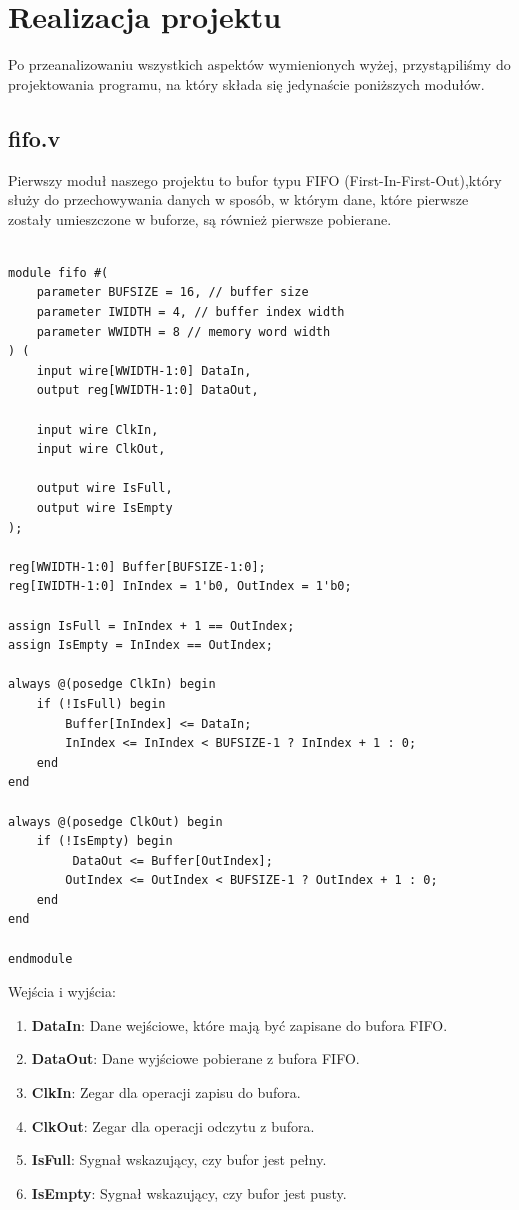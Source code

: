 \documentclass[12pt, a4paper]{article}
\begin{document}
\section{Realizacja projektu}
Po przeanalizowaniu wszystkich aspektów wymienionych wyżej, przystąpiliśmy do
projektowania programu, na który składa się jedynaście poniższych modułów.
\subsection{fifo.v}
Pierwszy moduł naszego projektu to bufor typu FIFO (First-In-First-Out),który służy do przechowywania danych w sposób, w którym dane, które pierwsze zostały umieszczone w buforze, są również pierwsze pobierane.
\begin{lstlisting}[style=prettyverilog,caption={Moduł fifo.v}]

module fifo #(
    parameter BUFSIZE = 16, // buffer size
    parameter IWIDTH = 4, // buffer index width
    parameter WWIDTH = 8 // memory word width
) (
    input wire[WWIDTH-1:0] DataIn,
    output reg[WWIDTH-1:0] DataOut,
    
    input wire ClkIn,
    input wire ClkOut,

    output wire IsFull,
    output wire IsEmpty
);

reg[WWIDTH-1:0] Buffer[BUFSIZE-1:0];
reg[IWIDTH-1:0] InIndex = 1'b0, OutIndex = 1'b0;

assign IsFull = InIndex + 1 == OutIndex;
assign IsEmpty = InIndex == OutIndex;

always @(posedge ClkIn) begin
    if (!IsFull) begin
        Buffer[InIndex] <= DataIn;
        InIndex <= InIndex < BUFSIZE-1 ? InIndex + 1 : 0;
    end
end

always @(posedge ClkOut) begin
    if (!IsEmpty) begin
	     DataOut <= Buffer[OutIndex];
        OutIndex <= OutIndex < BUFSIZE-1 ? OutIndex + 1 : 0;
    end
end

endmodule
\end{lstlisting}
Wejścia i wyjścia:
\begin{enumerate}
    \item \textbf{\fontsize{11}{10}\selectfont DataIn}: Dane wejściowe, które mają być zapisane do bufora FIFO.
    \item \textbf{\fontsize{11}{10}\selectfont DataOut}: Dane wyjściowe pobierane z bufora FIFO.
    \item \textbf{\fontsize{11}{10}\selectfont ClkIn}: Zegar dla operacji zapisu do bufora.
    \item \textbf{\fontsize{11}{10}\selectfont ClkOut}: Zegar dla operacji odczytu z bufora.
    \item \textbf{\fontsize{11}{10}\selectfont IsFull}: Sygnał wskazujący, czy bufor jest pełny.
    \item \textbf{\fontsize{11}{10}\selectfont IsEmpty}: Sygnał wskazujący, czy bufor jest pusty.
\end{enumerate}
\end{document}
